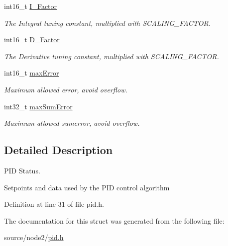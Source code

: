 \begin{DoxyCompactItemize}
int16\+\_\+t \hyperlink{struct_p_i_d___d_a_t_a_a27fadf88e502b77612cf733ca336e1a9}{I\+\_\+\+Factor}
\begin{DoxyCompactList}\small\item\em The Integral tuning constant, multiplied with S\+C\+A\+L\+I\+N\+G\+\_\+\+F\+A\+C\+T\+OR. \end{DoxyCompactList}\item 
\mbox{\label{struct_p_i_d___d_a_t_a_a77a0668d1381d333ca942dc250afe32d}} 
int16\+\_\+t \hyperlink{struct_p_i_d___d_a_t_a_a77a0668d1381d333ca942dc250afe32d}{D\+\_\+\+Factor}
\begin{DoxyCompactList}\small\item\em The Derivative tuning constant, multiplied with S\+C\+A\+L\+I\+N\+G\+\_\+\+F\+A\+C\+T\+OR. \end{DoxyCompactList}\item 
\mbox{\label{struct_p_i_d___d_a_t_a_a80263266448b31cb1b80b30a9a990fe3}} 
int16\+\_\+t \hyperlink{struct_p_i_d___d_a_t_a_a80263266448b31cb1b80b30a9a990fe3}{max\+Error}
\begin{DoxyCompactList}\small\item\em Maximum allowed error, avoid overflow. \end{DoxyCompactList}\item 
\mbox{\label{struct_p_i_d___d_a_t_a_ae580ff6ff0cb31d86d094f1de1270bd7}} 
int32\+\_\+t \hyperlink{struct_p_i_d___d_a_t_a_ae580ff6ff0cb31d86d094f1de1270bd7}{max\+Sum\+Error}
\begin{DoxyCompactList}\small\item\em Maximum allowed sumerror, avoid overflow. \end{DoxyCompactList}\end{DoxyCompactItemize}


\subsection{Detailed Description}
P\+ID Status. 

Setpoints and data used by the P\+ID control algorithm 

Definition at line 31 of file pid.\+h.



The documentation for this struct was generated from the following file\+:\begin{DoxyCompactItemize}
\item 
source/node2/\hyperlink{pid_8h}{pid.\+h}\end{DoxyCompactItemize}
